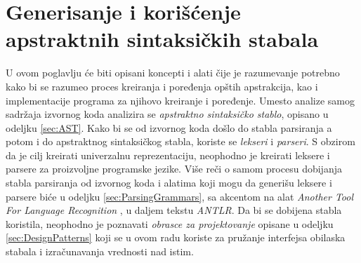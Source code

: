 \chapter[Apstraktna sintaksička stabla]{Generisanje i korišćenje apstraktnih sintaksičkih stabala}
\label{chp:RelevantTerms}

U ovom poglavlju će biti opisani koncepti i alati čije je razumevanje potrebno kako bi se razumeo proces kreiranja i poređenja opštih apstrakcija, kao i implementacije programa za njihovo kreiranje i poređenje. Umesto analize samog sadržaja izvornog koda analizira se \emph{apstraktno sintaksičko stablo}, opisano u odeljku \ref{sec:AST}. Kako bi se od izvornog koda došlo do stabla parsiranja a potom i do apstraktnog sintaksičkog stabla, koriste se \emph{lekseri} i \emph{parseri}. S obzirom da je cilj kreirati univerzalnu reprezentaciju, neophodno je kreirati leksere i parsere za proizvoljne programske jezike. Više reči o samom procesu dobijanja stabla parsiranja od izvornog koda i alatima koji mogu da generišu leksere i parsere biće u odeljku \ref{sec:ParsingGrammars}, sa akcentom na alat \emph{Another Tool For Language Recognition} \cite{ANTLR}, u daljem tekstu \emph{ANTLR}. Da bi se dobijena stabla koristila, neophodno je poznavati \emph{obrasce za projektovanje} opisane u odeljku \ref{sec:DesignPatterns} koji se u ovom radu koriste za pružanje interfejsa obilaska stabala i izračunavanja vrednosti nad istim.




